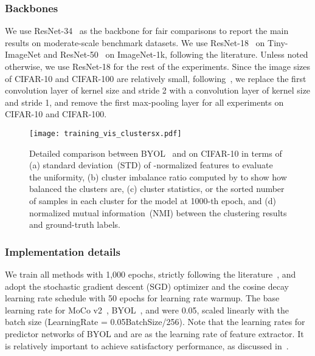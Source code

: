 \subsubsection{Backbones}
We use ResNet-34~\cite{he2016deep} as the backbone for fair comparisons to report the main results on moderate-scale benchmark datasets. We use ResNet-18~\cite{he2016deep} on Tiny-ImageNet and ResNet-50~\cite{he2016deep} on ImageNet-1k, following the literature. Unless noted otherwise, we use ResNet-18 for the rest of the experiments. Since the image sizes of CIFAR-10 and CIFAR-100 are relatively small, following~\cite{chen2020simple}, we replace the first convolution layer of kernel size  and stride 2 with a convolution layer of kernel size  and stride 1, and remove the first max-pooling layer for all experiments on CIFAR-10 and CIFAR-100.

\begin{figure*}[t]
  \centering
  \texttt{[image: training\_vis\_clustersx.pdf]}
  \caption{
  Detailed comparison between BYOL~\cite{grill2020bootstrap} and \methodname on CIFAR-10 in terms of (a) standard deviation~(STD) of -normalized features to evaluate the uniformity, (b) cluster imbalance ratio computed by  to show how balanced the clusters are,  (c) cluster statistics, or the sorted number of samples in each cluster for the model at 1000-th epoch, and (d) normalized mutual information~(NMI) between the clustering results and ground-truth labels.
  }
  \label{fig:training_vis_clusters}
\end{figure*}

\subsubsection{Implementation details}
\label{sec:implementation_details}
We train all methods with 1,000 epochs, strictly following the literature~\cite{tsai2020mice,tao2021clustering}, and adopt the stochastic gradient descent (SGD) optimizer and the cosine decay learning rate schedule with 50 epochs for learning rate warmup. The base learning rate for MoCo v2~\cite{chen2020improved}, BYOL~\cite{grill2020bootstrap}, and \methodname were 0.05, scaled linearly with the batch size (LearningRate = 0.05BatchSize/256). Note that the learning rates for predictor networks of BYOL and \methodname are  as the learning rate of feature extractor. It is relatively important to achieve satisfactory performance, as discussed in~\cite{grill2020bootstrap,chen2021exploring}. 

